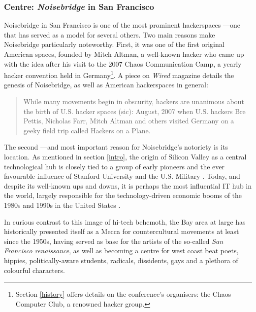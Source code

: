 \subsubsection{Centre: \textit{Noisebridge} in San Francisco}

Noisebridge in San Francisco is one of the most prominent hackerspaces ---one that has served as a model for several others. Two main reasons make Noisebridge particularly noteworthy. First, it was one of the first original American spaces, founded by Mitch Altman, a well-known hacker who came up with the idea after his visit to the 2007 Chaos Communication Camp, a yearly hacker convention held in Germany\footnote{Section \ref{history} offers details on the conference's organisers: the Chaos Computer Club, a renowned hacker group.}. A piece on \textit{Wired} magazine details the genesis of Noisebridge, as well as American hackerspaces in general:

\begin{quote}
While many movements begin in obscurity, hackers are unanimous about the birth of U.S. hacker spaces (sic): August, 2007 when U.S. hackers Bre Pettis, Nicholas Farr, Mitch Altman and others visited Germany on a geeky field trip called Hackers on a Plane. \citep{tweney09}
\end{quote}

The second ---and most important reason for Noisebridge's notoriety is its location. As mentioned in section \ref{intro}, the origin of Silicon Valley as a central technological hub is closely tied to a group of early pioneers and the ever favourable influence of Stanford University and the U.S. Military \citep{lee00}. Today, and despite its well-known ups and downs, it is perhaps the most influential IT hub in the world, largely responsible for the technology-driven economic booms of the 1980s and 1990s in the United States \citep{bresnahan04}.

In curious contrast to this image of hi-tech behemoth, the Bay area at large has historically presented itself as a Mecca for countercultural movements at least since the 1950s, having served as base for the artists of the so-called \textit{San Francisco renaissance}, as well as becoming a centre for west coast beat poets, hippies, politically-aware students, radicals, dissidents, gays and a plethora of colourful characters.

